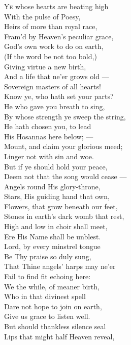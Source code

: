 \textsc{Ye} whose hearts are beating high \\
 With the pulse of Poesy, \\
 Heirs of more than royal race, \\
 Fram’d by Heaven’s peculiar grace, \\
 God’s own work to do on earth, \\
 (If the word be not too bold,) \\
 Giving virtue a new birth, \\
 And a life that ne’er grows old — \\
  Sovereign masters of all hearts! \\
 Know ye, who hath set your parts? \\
 He who gave you breath to sing, \\
 By whose strength ye sweep the string, \\
 He hath chosen you, to lead \\
 His Hosannas here below; — \\
 Mount, and claim your glorious meed; \\
 Linger not with sin and woe. \\
  But if ye should hold your peace, \\
 Deem not that the song would cease — \\
 Angels round His glory-throne, \\
 Stars, His guiding hand that own, \\
 Flowers, that grow beneath our feet, \\
 Stones in earth’s dark womb that rest, \\
 High and low in choir shall meet, \\
 Ere His Name shall be unblest. \\
  Lord, by every minstrel tongue \\
 Be Thy praise so duly sung, \\
 That Thine angels’ harps may ne’er \\
 Fail to find fit echoing here: \\
 We the while, of meaner birth, \\
 Who in that divinest spell \\
 Dare not hope to join on earth, \\
 Give us grace to listen well. \\
  But should thankless silence seal \\
 Lips that might half Heaven reveal, \\
